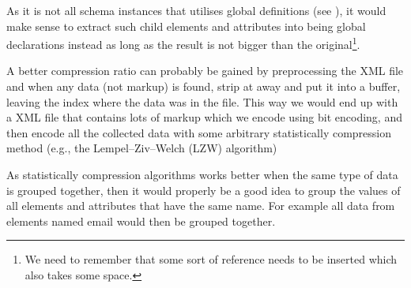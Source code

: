 \documentclass[a4paper, oneside]{memoir}
\theoremstyle{definition}
\begin{document}
\begin{description}
\item[Refactoring] As it is not all schema instances that utilises global
  definitions (see \label{sec:local-global-schema-definitions}), it would make
  sense to extract such child elements and attributes into being global
  declarations instead as long as the result is not bigger than the
  original\footnote{We need to remember that some sort of reference needs to be inserted
    which also takes some space.}.

\item {}A better compression ratio can probably be gained by preprocessing the XML
  file and when any data (not markup) is found, strip at away and put it into a
  buffer, leaving the index where the data was in the file. This way we would
  end up with a XML file that contains lots of markup which we encode using bit
  encoding, and then encode all the collected data with some arbitrary
  statistically compression method (e.g., the Lempel–Ziv–Welch (LZW) algorithm)

  As statistically compression algorithms works better when the same type of
  data is grouped together, then it would properly be a good idea to group the
  values of all elements and attributes that have the same name. For example all
  data from elements named email would then be grouped together.


\item 

\end{description}

\clearpage


% 

\end{document}
